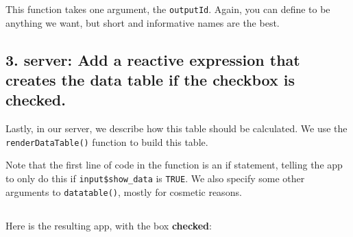 \documentclass[
  letterpaper,
  DIV=11,
  numbers=noendperiod]{scrreprt}
\newenvironment{Shaded}{\begin{snugshade}}{\end{snugshade}}
\newcommand{\AttributeTok}[1]{\textcolor[rgb]{0.40,0.46,0.14}{#1}}
\newcommand{\CommentTok}[1]{\textcolor[rgb]{0.37,0.37,0.37}{#1}}
\newcommand{\ConstantTok}[1]{\textcolor[rgb]{0.56,0.35,0.01}{#1}}
\newcommand{\ControlFlowTok}[1]{\textcolor[rgb]{0.00,0.46,0.62}{#1}}
\newcommand{\DecValTok}[1]{\textcolor[rgb]{0.68,0.00,0.00}{#1}}
\newcommand{\FunctionTok}[1]{\textcolor[rgb]{0.28,0.35,0.67}{#1}}
\newcommand{\NormalTok}[1]{\textcolor[rgb]{0.00,0.46,0.62}{#1}}
\newcommand{\OtherTok}[1]{\textcolor[rgb]{0.00,0.46,0.62}{#1}}
\newcommand{\SpecialCharTok}[1]{\textcolor[rgb]{0.37,0.37,0.37}{#1}}
\begin{document}
This function takes one argument, the \texttt{outputId}. Again, you can
define to be anything we want, but short and informative names are the
best.

\hypertarget{server-add-a-reactive-expression-that-creates-the-data-table-if-the-checkbox-is-checked.}{%
\subsection{\texorpdfstring{3. \textbf{server}: Add a reactive
expression that creates the data table if the checkbox is
checked.}{3. server: Add a reactive expression that creates the data table if the checkbox is checked.}}\label{server-add-a-reactive-expression-that-creates-the-data-table-if-the-checkbox-is-checked.}}

\begin{Shaded}
\end{Shaded}

Lastly, in our server, we describe how this table should be calculated.
We use the \texttt{renderDataTable()} function to build this table.

Note that the first line of code in the function is an if statement,
telling the app to only do this if \texttt{input\$show\_data} is
\texttt{TRUE}. We also specify some other arguments to
\texttt{datatable()}, mostly for cosmetic reasons.

\hypertarget{section-34}{%
\subsection{}\label{section-34}}

Here is the resulting app, with the box \textbf{checked}:
\end{document}

